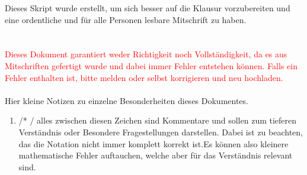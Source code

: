 Dieses Skript wurde erstellt, um sich besser auf die Klausur vorzubereiten und eine ordentliche und für alle Personen lesbare Mitschrift zu haben. \\
\qquad\\
\qquad\\
\textcolor{red}{\Large{Dieses Dokument garantiert weder Richtigkeit noch Vollständigkeit, da es aus Mitschriften gefertigt wurde und dabei immer Fehler entstehen können. Falls ein Fehler enthalten ist, bitte melden oder selbst korrigieren und neu hochladen.}}
\qquad\\
\qquad\\
\large{Hier kleine Notizen zu einzelne Besonderheiten dieses Dokumentes.} \\
\normalsize{
\begin{enumerate}
	\item /* \qquad */  alles zwischen diesen Zeichen sind Kommentare und sollen zum tieferen Verständnis oder Besondere Fragestellungen darstellen. Dabei ist zu beachten, das die Notation nicht immer komplett korrekt ist.Es können also kleinere mathematische Fehler auftauchen, welche aber für das Verständnis relevant sind.
\end{enumerate}
}